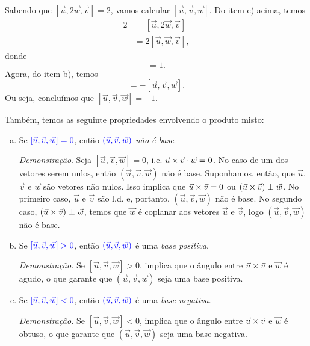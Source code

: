 \begin{ex}
  Sabendo que $[\vec{u},2\vec{w},\vec{v}] = 2$, vamos calcular $[\vec{u},\vec{v},\vec{w}]$. Do item e) acima, temos
  \begin{align}
    2 &= [\vec{u},2\vec{w},\vec{v}] \\
      &= 2[\vec{u},\vec{w},\vec{v}],
  \end{align}
  donde
  \begin{equation}
    [\vec{u},\vec{w},\vec{v}] = 1.
  \end{equation}
  Agora, do item b), temos
  \begin{equation}
    [\vec{u},\vec{w},\vec{v}] = -[\vec{u},\vec{v},\vec{w}].
  \end{equation}
  Ou seja, concluímos que $[\vec{u},\vec{v},\vec{w}] =  -1$.
\end{ex}

Também, temos as seguinte propriedades envolvendo o produto misto:
\begin{enumerate}[a)]
\item Se ${\color{blue}[\vec{u},\vec{v},\vec{w}] = 0}$, então ${\color{blue}(\vec{u},\vec{v},\vec{w})}$ \emph{não é base}.

  {\it Demonstração}. Seja $[\vec{u},\vec{v},\vec{w}]=0$, i.e. $\vec{u}\times\vec{v}\cdot\vec{w}=0$. No caso de um dos vetores serem nulos, então $(\vec{u},\vec{v},\vec{w})$ não é base. Suponhamos, então, que $\vec{u}$, $\vec{v}$ e $\vec{w}$ são vetores não nulos. Isso implica que $\vec{u}\times\vec{v}=0$ ou $(\vec{u}\times\vec{v})\perp\vec{w}$. No primeiro caso, $\vec{u}$ e $\vec{v}$ são l.d. e, portanto, $(\vec{u},\vec{v},\vec{w})$  não é base. No segundo caso, $(\vec{u}\times\vec{v})\perp\vec{w}$, temos que $\vec{w}$ é coplanar aos vetores $\vec{u}$ e $\vec{v}$, logo $(\vec{u},\vec{v},\vec{w})$ não é base.
  
\item Se ${\color{blue}[\vec{u},\vec{v},\vec{w}] > 0}$, então ${\color{blue}(\vec{u},\vec{v},\vec{w})}$ é uma \emph{base positiva}.

  {\it Demonstração.} Se $[\vec{u},\vec{v},\vec{w}] > 0$, implica que o ângulo entre $\vec{u}\times\vec{v}$ e $\vec{w}$ é agudo, o que garante que $(\vec{u},\vec{v},\vec{w})$ seja uma base positiva.
  
\item Se ${\color{blue}[\vec{u},\vec{v},\vec{w}] < 0}$, então ${\color{blue}(\vec{u},\vec{v},\vec{w})}$ é uma \emph{base negativa}.

  {\it Demonstração.} Se $[\vec{u},\vec{v},\vec{w}] < 0$, implica que o ângulo entre $\vec{u}\times\vec{v}$ e $\vec{w}$ é obtuso, o que garante que $(\vec{u},\vec{v},\vec{w})$ seja uma base negativa.
\end{enumerate}

